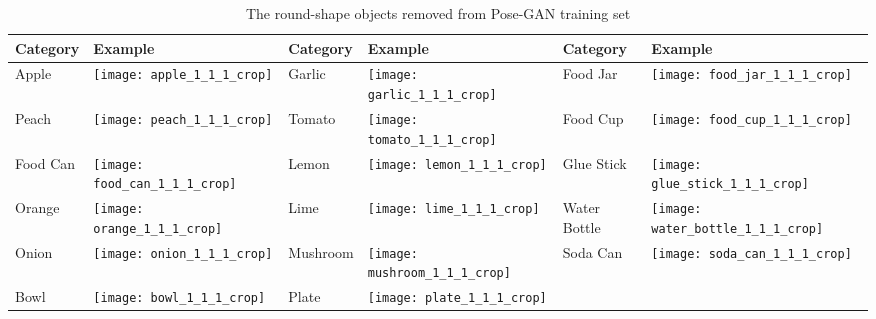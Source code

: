 \begin{table}[h!]
	\centering
	\caption{The round-shape objects removed from Pose-GAN training set}
	\label{tab:removed_objects}
	\begin{tabular}{@{}llllll@{}}
		\toprule
		\textbf{Category}              & \textbf{Example}      & \textbf{Category}
		& \textbf{Example}      & \textbf{Category}             & \textbf{Example}      \\
		\midrule \multicolumn{1}{|l|}{Apple}    &
		\multicolumn{1}{l|}{\texttt{[image: apple\_1\_1\_1\_crop]}} &
		\multicolumn{1}{l|}{Garlic}       &
		\multicolumn{1}{l|}{\texttt{[image: garlic\_1\_1\_1\_crop]}} &
		\multicolumn{1}{l|}{Food Jar} &
		\multicolumn{1}{l|}{\texttt{[image: food\_jar\_1\_1\_1\_crop]}}
		\\
		\midrule 
		\multicolumn{1}{|l|}{Peach}    &
		\multicolumn{1}{l|}{\texttt{[image: peach\_1\_1\_1\_crop]}} &
		\multicolumn{1}{l|}{Tomato}   &
		\multicolumn{1}{l|}{\texttt{[image: tomato\_1\_1\_1\_crop]}} &
		\multicolumn{1}{l|}{Food Cup} &
		\multicolumn{1}{l|}{\texttt{[image: food\_cup\_1\_1\_1\_crop]}}
		\\
		\midrule 
		\multicolumn{1}{|l|}{Food Can} &
		\multicolumn{1}{l|}{\texttt{[image: food\_can\_1\_1\_1\_crop]}} & 
		\multicolumn{1}{l|}{Lemon}        &
		\multicolumn{1}{l|}{\texttt{[image: lemon\_1\_1\_1\_crop]}} &
		\multicolumn{1}{l|}{Glue Stick}   &
		\multicolumn{1}{l|}{\texttt{[image: glue\_stick\_1\_1\_1\_crop]}}
		\\
		\midrule 
		\multicolumn{1}{|l|}{Orange}   &
		\multicolumn{1}{l|}{\texttt{[image: orange\_1\_1\_1\_crop]}} &
		\multicolumn{1}{l|}{Lime}         &
		\multicolumn{1}{l|}{\texttt{[image: lime\_1\_1\_1\_crop]}} &
		\multicolumn{1}{l|}{Water Bottle} &
		\multicolumn{1}{l|}{\texttt{[image: water\_bottle\_1\_1\_1\_crop]}}
		\\
		\midrule 
		\multicolumn{1}{|l|}{Onion}    &
		\multicolumn{1}{l|}{\texttt{[image: onion\_1\_1\_1\_crop]}} &
		\multicolumn{1}{l|}{Mushroom}     &
		\multicolumn{1}{l|}{\texttt{[image: mushroom\_1\_1\_1\_crop]}} &
		\multicolumn{1}{l|}{Soda Can} &
		\multicolumn{1}{l|}{\texttt{[image: soda\_can\_1\_1\_1\_crop]}} \\
		\midrule 
		\multicolumn{1}{|l|}{Bowl}     &
		\multicolumn{1}{l|}{\texttt{[image: bowl\_1\_1\_1\_crop]}} &
		\multicolumn{1}{l|}{Plate}    &
		\multicolumn{1}{l|}{\texttt{[image: plate\_1\_1\_1\_crop]}} &

		&                       \\ \cmidrule(r){1-4}
	\end{tabular}
\end{table}

